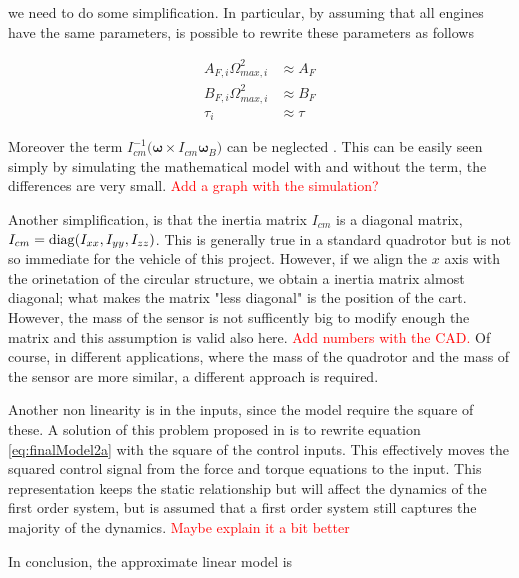 \noindent we need to do some simplification. In particular, by assuming that all engines have the same parameters, is possible to rewrite these parameters as follows

\begin{align}
	A_{F,i}\Omega_{max,i}^2 &\approx A_F \\
	B_{F,i}\Omega_{max,i}^2 &\approx B_F \\
	\tau_i &\approx \tau
	\label{eq:simplification}
\end{align}

\noindent Moreover the term $I_{cm}^{-1}\bigl(\boldsymbol{\omega}\times I_{cm}\boldsymbol{\omega}_B\bigl)$ can be neglected \cite{modelIdentification}. This can be easily seen simply by simulating the mathematical model with and without the term, the differences are very small. \textcolor{red}{Add a graph with the simulation?}

\noindent Another simplification, is that the inertia matrix $I_{cm}$ is a diagonal matrix, $I_{cm} = \operatorname*{diag}(\allowbreak I_{xx}, I_{yy}, I_{zz})$. This is generally true in a standard quadrotor but is not so immediate for the vehicle of this project. However, if we align the $x$ axis with the orinetation of the circular structure, we obtain a inertia matrix almost diagonal; what makes the matrix "less diagonal" is the position of the cart. However, the mass of the sensor is not sufficently big to modify enough the matrix and this assumption is valid also here. \textcolor{red}{Add numbers with the CAD.} Of course, in different applications, where the mass of the quadrotor and the mass of the sensor are more similar, a different approach is required.

\noindent Another non linearity is in the inputs, since the model require the square of these. A solution of this problem proposed in \cite{modelIdentification} is to rewrite equation \eqref{eq:finalModel2a} with the square of the control inputs. This effectively moves the squared control signal from the force and torque equations to the input. This representation keeps the static relationship but will affect the dynamics of the first order system, but is assumed that a first order system still captures the majority of the dynamics. \textcolor{red}{Maybe explain it a bit better}

\noindent In conclusion, the approximate linear model is

